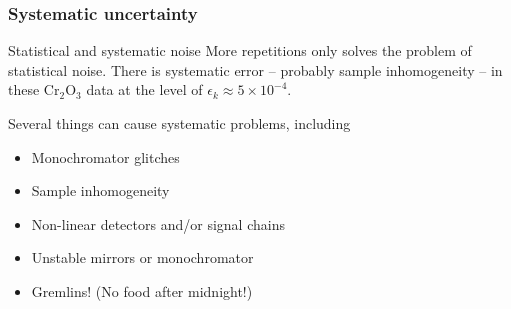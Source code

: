 \documentclass[10pt, xcolor=x11names, compress]{beamer}
\begin{document}
\begin{frame}
  \frametitle{Systematic uncertainty}

  \begin{block}{Statistical and systematic noise}
    More repetitions only solves the problem of statistical noise.
    There is systematic error -- probably sample inhomogeneity -- in
    these Cr$_2$O$_3$ data at the level of $\epsilon_k \approx 5\times
    10^{-4}$.
  \end{block}

  \bigskip

  Several things can cause systematic problems, including
  \begin{itemize}
  \item Monochromator glitches
  \item Sample inhomogeneity
  \item Non-linear detectors and/or signal chains
  \item Unstable mirrors or monochromator
  \item Gremlins!  (No food after midnight!)
  \end{itemize}
\end{frame}
\end{document}
